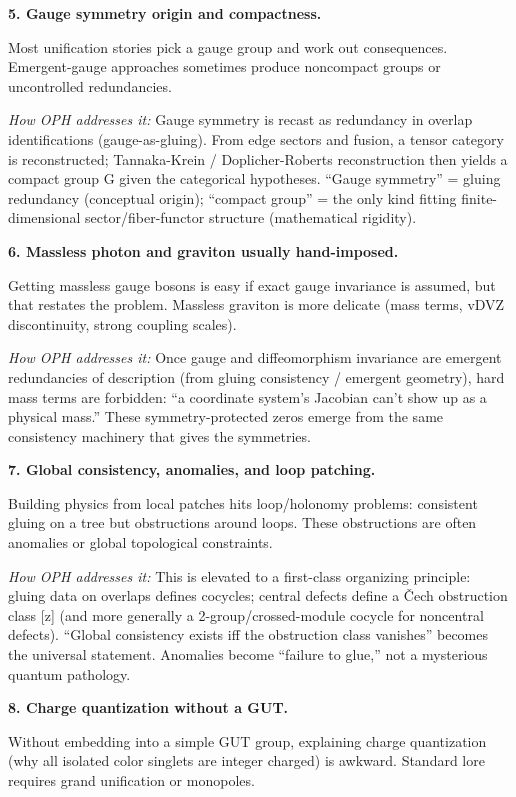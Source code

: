\documentclass[
]{article}
\begin{document}
\textbf{5. Gauge symmetry origin and compactness.}

Most unification stories pick a gauge group and work out consequences.
Emergent-gauge approaches sometimes produce noncompact groups or
uncontrolled redundancies.

\emph{How OPH addresses it:} Gauge symmetry is recast as redundancy in
overlap identifications (gauge-as-gluing). From edge sectors and fusion,
a tensor category is reconstructed; Tannaka-Krein / Doplicher-Roberts
reconstruction then yields a compact group G given the categorical
hypotheses. ``Gauge symmetry'' = gluing redundancy (conceptual origin);
``compact group'' = the only kind fitting finite-dimensional
sector/fiber-functor structure (mathematical rigidity).

\textbf{6. Massless photon and graviton usually hand-imposed.}

Getting massless gauge bosons is easy if exact gauge invariance is
assumed, but that restates the problem. Massless graviton is more
delicate (mass terms, vDVZ discontinuity, strong coupling scales).

\emph{How OPH addresses it:} Once gauge and diffeomorphism invariance
are emergent redundancies of description (from gluing consistency /
emergent geometry), hard mass terms are forbidden: ``a coordinate
system's Jacobian can't show up as a physical mass.'' These
symmetry-protected zeros emerge from the same consistency machinery that
gives the symmetries.

\textbf{7. Global consistency, anomalies, and loop patching.}

Building physics from local patches hits loop/holonomy problems:
consistent gluing on a tree but obstructions around loops. These
obstructions are often anomalies or global topological constraints.

\emph{How OPH addresses it:} This is elevated to a first-class
organizing principle: gluing data on overlaps defines cocycles; central
defects define a Čech obstruction class {[}z{]} (and more generally a
2-group/crossed-module cocycle for noncentral defects). ``Global
consistency exists iff the obstruction class vanishes'' becomes the
universal statement. Anomalies become ``failure to glue,'' not a
mysterious quantum pathology.

\textbf{8. Charge quantization without a GUT.}

Without embedding into a simple GUT group, explaining charge
quantization (why all isolated color singlets are integer charged) is
awkward. Standard lore requires grand unification or monopoles.
\end{document}

